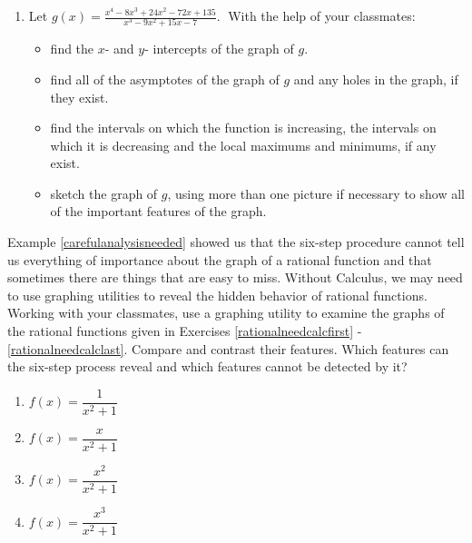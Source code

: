 \documentclass{ximera}
\begin{document}
\begin{enumerate}
\setcounter{enumi}{\value{HW}}


\item Let $g(x) = \displaystyle \frac{x^{4} - 8x^{3} + 24x^{2} - 72x + 135}{x^{3} - 9x^{2} + 15x - 7}.\;$  With the help of your classmates:

\begin{itemize}

\item  find the $x$- and $y$- intercepts of the graph of $g$.

\item   find all of the asymptotes of the graph of $g$ and any holes in the graph, if they exist.

\item find the intervals on which the function is increasing, the intervals on which it is decreasing and the local maximums and minimums, if any exist.

\item sketch the graph of $g$, using more than one picture if necessary to show all of the important features of the graph.

\end{itemize}

\setcounter{HW}{\value{enumi}}
\end{enumerate}

Example \ref{carefulanalysisneeded} showed us that the six-step procedure cannot tell us everything of importance about the graph of a rational function and that sometimes there are things that are easy to miss.  Without Calculus, we may need to use graphing utilities to reveal the hidden behavior of rational functions.  Working with your classmates, use a graphing utility to examine the graphs of the rational functions given in Exercises \ref{rationalneedcalcfirst} - \ref{rationalneedcalclast}.  Compare and contrast their features.  Which features can the six-step process reveal and which features cannot be detected by it?

\begin{enumerate}
\setcounter{enumi}{\value{HW}}

\item $f(x) = \dfrac{1}{x^{2} + 1}$   \label{rationalneedcalcfirst}
\item $f(x) = \dfrac{x}{x^{2} + 1}$ 
\item $f(x) = \dfrac{x^{2}}{x^{2} + 1}$ 
\item $f(x) = \dfrac{x^{3}}{x^{2} + 1}$  \label{rationalneedcalclast}

\setcounter{HW}{\value{enumi}}
\end{enumerate}
\end{document}
